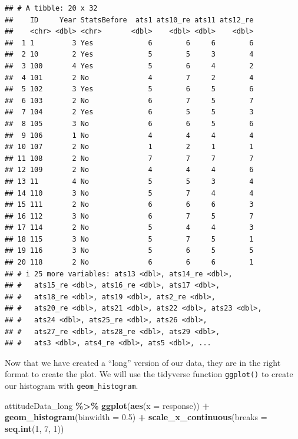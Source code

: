 \documentclass[
  12pt,
]{book}
\newenvironment{Shaded}{\begin{snugshade}}{\end{snugshade}}
\newcommand{\AttributeTok}[1]{\textcolor[rgb]{0.13,0.29,0.53}{#1}}
\newcommand{\DecValTok}[1]{\textcolor[rgb]{0.00,0.00,0.81}{#1}}
\newcommand{\FloatTok}[1]{\textcolor[rgb]{0.00,0.00,0.81}{#1}}
\newcommand{\FunctionTok}[1]{\textcolor[rgb]{0.13,0.29,0.53}{\textbf{#1}}}
\newcommand{\NormalTok}[1]{#1}
\newcommand{\SpecialCharTok}[1]{\textcolor[rgb]{0.81,0.36,0.00}{\textbf{#1}}}
\begin{document}
\begin{verbatim}
## # A tibble: 20 x 32
##    ID     Year StatsBefore  ats1 ats10_re ats11 ats12_re
##    <chr> <dbl> <chr>       <dbl>    <dbl> <dbl>    <dbl>
##  1 1         3 Yes             6        6     6        6
##  2 10        2 Yes             5        5     3        4
##  3 100       4 Yes             5        6     4        2
##  4 101       2 No              4        7     2        4
##  5 102       3 Yes             5        6     5        6
##  6 103       2 No              6        7     5        7
##  7 104       2 Yes             6        5     5        3
##  8 105       3 No              6        6     5        6
##  9 106       1 No              4        4     4        4
## 10 107       2 No              1        2     1        1
## 11 108       2 No              7        7     7        7
## 12 109       2 No              4        4     4        6
## 13 11        4 No              5        5     3        4
## 14 110       3 No              5        7     4        4
## 15 111       2 No              6        6     6        3
## 16 112       3 No              6        7     5        7
## 17 114       2 No              5        4     4        3
## 18 115       3 No              5        7     5        1
## 19 116       3 No              5        6     5        5
## 20 118       2 No              6        6     6        1
## # i 25 more variables: ats13 <dbl>, ats14_re <dbl>,
## #   ats15_re <dbl>, ats16_re <dbl>, ats17 <dbl>,
## #   ats18_re <dbl>, ats19 <dbl>, ats2_re <dbl>,
## #   ats20_re <dbl>, ats21 <dbl>, ats22 <dbl>, ats23 <dbl>,
## #   ats24 <dbl>, ats25_re <dbl>, ats26 <dbl>,
## #   ats27_re <dbl>, ats28_re <dbl>, ats29 <dbl>,
## #   ats3 <dbl>, ats4_re <dbl>, ats5 <dbl>, ...
\end{verbatim}

Now that we have created a ``long'' version of our data, they are in the right format to create the plot. We will use the tidyverse function \texttt{ggplot()} to create our histogram with \texttt{geom\_histogram}.

\begin{Shaded}
\begin{Highlighting}[]
\NormalTok{attitudeData\_long }\SpecialCharTok{\%\textgreater{}\%} 
  \FunctionTok{ggplot}\NormalTok{(}\FunctionTok{aes}\NormalTok{(}\AttributeTok{x =}\NormalTok{ response)) }\SpecialCharTok{+}
  \FunctionTok{geom\_histogram}\NormalTok{(}\AttributeTok{binwidth =} \FloatTok{0.5}\NormalTok{) }\SpecialCharTok{+}
  \FunctionTok{scale\_x\_continuous}\NormalTok{(}\AttributeTok{breaks =} \FunctionTok{seq.int}\NormalTok{(}\DecValTok{1}\NormalTok{, }\DecValTok{7}\NormalTok{, }\DecValTok{1}\NormalTok{))}
\end{Highlighting}
\end{Shaded}
\end{document}

